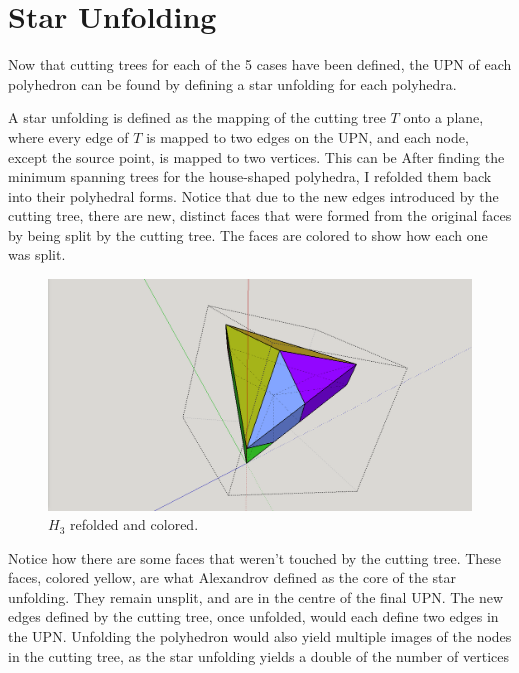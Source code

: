 \documentclass[12 pt]{article}
\begin{document}

\section{Star Unfolding}
Now that cutting trees for each of the 5 cases have been defined, the UPN of each polyhedron can be found by defining a star unfolding for each polyhedra.

A star unfolding is defined as the mapping \cite{GFALOP:1} of the cutting tree $T$ onto a plane, where every edge of $T$ is mapped to two edges on the UPN, and each node, except the source point, is mapped to two vertices. This can be 
After finding the minimum spanning trees for the house-shaped polyhedra, I refolded them back into their polyhedral forms. Notice that due to the new edges introduced by the cutting tree, there are new, distinct faces that were formed from the original faces by being split by the cutting tree. The faces are  colored to show how each one was split.
\begin{figure}[h]
\centering
\caption{$H_3$ refolded and colored.}
\includegraphics[scale=0.15]{finalUNP/h3ColorTop.png}
\end{figure}
Notice how there are some faces that weren't touched by the cutting tree. These faces, colored yellow, are what Alexandrov \cite{ALEXANDROV} defined as the core of the star unfolding. They remain unsplit, and are in the centre of the final UPN.
 The new edges defined by the cutting tree, once unfolded, would each define two edges in the UPN. Unfolding the polyhedron would also yield multiple images of the nodes in the cutting tree, as the star unfolding yields a double of the number of vertices 
 
\end{document}
